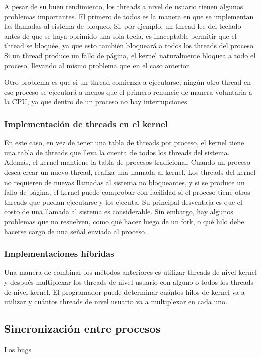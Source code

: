 A pesar de su buen rendimiento, los threads a nivel de usuario tienen algunos problemas importantes. El primero de todos es la manera en que se implementan las llamadas al sistema de bloqueo. Si, por ejemplo, un thread lee del teclado antes de que se haya oprimido una sola tecla, es inaceptable permitir que el thread se bloquée, ya que esto también bloqueará a todos los threads del proceso. Si un thread produce un fallo de página, el kernel naturalmente bloquea a todo el proceso, llevando al mismo problema que en el caso anterior.

Otro problema es que si un thread comienza a ejecutarse, ningún otro thread en ese proceso se ejecutará a menos que el primero renuncie de manera voluntaria a la CPU, ya que dentro de un proceso no hay interrupciones.

\subsubsection{Implementación de threads en el kernel}

En este caso, en vez de tener una tabla de threads por proceso, el kernel tiene una tabla de threads que lleva la cuenta de todos los threads del sistema. Además, el kernel mantiene la tabla de procesos tradicional. Cuando un proceso desea crear un nuevo thread, realiza una llamada al kernel. Los threads del kernel no requieren de nuevas llamadas al sistema no bloqueantes, y si se produce un fallo de página, el kernel puede comprobar con facilidad si el proceso tiene otros threads que puedan ejecutarse y los ejecuta. Su principal desventaja es que el costo de una llamada al sistema es considerable. Sin embargo, hay algunos problemas que no resuelven, como qué hacer luego de un fork, o qué hilo debe hacerse cargo de una señal enviada al proceso.

\subsubsection{Implementaciones híbridas}

Una manera de combinar los métodos anteriores es utilizar threads de nivel kernel y después multiplexar los threads de nivel usuario con alguno o todos los threads de nivel kernel. El programador puede determinar cuántos hilos de kernel va a utilizar y cuántos threads de nivel usuario va a multiplexar en cada uno.


\subsection{Sincronización entre procesos}

Los bugs